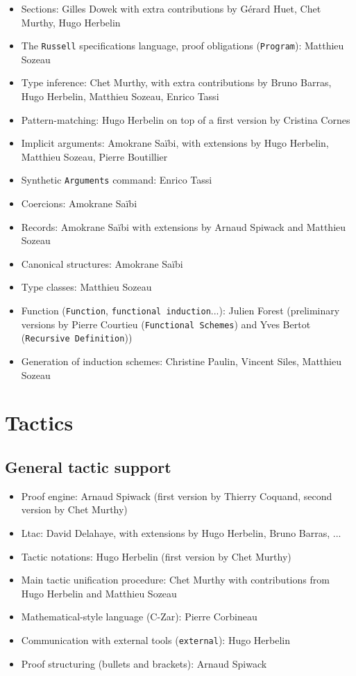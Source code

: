 \documentclass{article}
\begin{document}
\begin{itemize}
\item Sections: Gilles Dowek with extra contributions by Gérard
  Huet, Chet Murthy, Hugo Herbelin
\item The \texttt{Russell} specifications language, proof obligations (\texttt{Program}): Matthieu Sozeau
\item Type inference: Chet Murthy, with extra contributions by Bruno
  Barras, Hugo Herbelin, Matthieu Sozeau, Enrico Tassi
\item Pattern-matching: Hugo Herbelin on top of a first version by
  Cristina Cornes
\item Implicit arguments: Amokrane Saïbi, with extensions by Hugo
  Herbelin, Matthieu Sozeau, Pierre Boutillier
\item Synthetic {\tt Arguments} command: Enrico Tassi
\item Coercions: Amokrane Saïbi
\item Records: Amokrane Saïbi with extensions by Arnaud Spiwack and
  Matthieu Sozeau
\item Canonical structures: Amokrane Saïbi
\item Type classes: Matthieu Sozeau
\item Function (\texttt{Function}, \texttt{functional induction}...):
  Julien Forest (preliminary versions by Pierre Courtieu
  (\texttt{Functional Schemes}) and Yves Bertot (\texttt{Recursive
    Definition}))
\item Generation of induction schemes: Christine Paulin, Vincent
  Siles, Matthieu Sozeau
 \end{itemize}

\section{Tactics}

\subsection{General tactic support}

\begin{itemize}
\item Proof engine: Arnaud Spiwack (first version by Thierry Coquand, second version by Chet Murthy)
\item Ltac: David Delahaye, with extensions by Hugo Herbelin, Bruno Barras, ...
\item Tactic notations: Hugo Herbelin (first version by Chet Murthy)
\item Main tactic unification procedure: Chet Murthy with
  contributions from Hugo Herbelin and Matthieu Sozeau
\item Mathematical-style language (C-Zar): Pierre Corbineau
\item Communication with external tools (\texttt{external}): Hugo Herbelin
\item Proof structuring (bullets and brackets): Arnaud Spiwack
\end{itemize}
\end{document}
